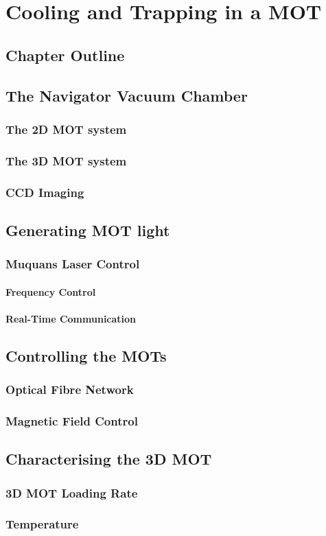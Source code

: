 \chapter{Cooling and Trapping in a MOT}
\section{Chapter Outline}

\section{The Navigator Vacuum Chamber}
\subsection{The 2D MOT system}
\subsection{The 3D MOT system}
\subsection{CCD Imaging}

\section{Generating MOT light}
\subsection{Muquans Laser Control}
\subsubsection{Frequency Control}
\subsubsection{Real-Time Communication}

\section{Controlling the MOTs}
\subsection{Optical Fibre Network}
\subsection{Magnetic Field Control}

\section{Characterising the 3D MOT}
\subsection{3D MOT Loading Rate}
\subsection{Temperature}

